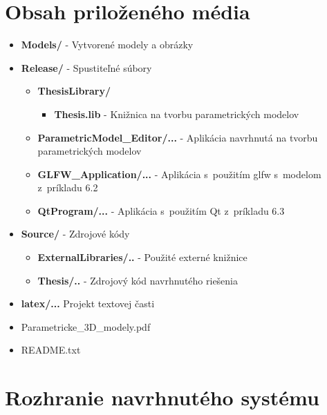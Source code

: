  \renewcommand\labelitemii{$\square$}
 \renewcommand\labelitemiii{$\circ$}
\chapter{Obsah priloženého média}
\begin{itemize}
\item \textbf{Models/} - Vytvorené modely a obrázky
\item \textbf{Release/} - Spustiteľné súbory
\begin{itemize}
    \item \textbf{ThesisLibrary/}
    \begin{itemize}
        \item \textbf{Thesis.lib} - Knižnica na tvorbu parametrických modelov
    \end{itemize}
    \item \textbf{ParametricModel\_Editor/...} - Aplikácia navrhnutá na tvorbu parametrických modelov
    \item \textbf{GLFW\_Application/...} - Aplikácia s~použitím glfw s~modelom z~príkladu 6.2
    \item \textbf{QtProgram/...} - Aplikácia s~použitím Qt z~príkladu 6.3
\end{itemize}  
\item \textbf{Source/} - Zdrojové kódy
\begin{itemize}
    \item \textbf{ExternalLibraries/..} - Použité externé knižnice
    \item \textbf{Thesis/..} - Zdrojový kód navrhnutého riešenia
\end{itemize}
\item \textbf{latex/...} Projekt textovej časti
\item Parametricke\_3D\_modely.pdf
\item README.txt
\end{itemize}

\chapter{Rozhranie navrhnutého systému}


